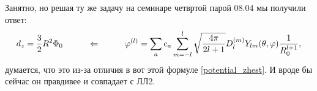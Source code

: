 Занятно, но решая ту же задачу на семинаре четвртой парой 08.04 мы получили ответ:
\begin{equation*}
 	d_z = \frac{3}{2}R^2 \Phi_0 	
 	\hspace{1 cm}
 	\Leftarrow
 	\hspace{1 cm}
 	\varphi^{(l)} = \sum_a e_a\sum_{m = -l}^l \sqrt{\frac{4 \pi}{2 l +1}} D_l^{(m)} Y_{l m} (\theta, \varphi) \frac{1}{R_0^{l+1}},
\end{equation*}
думается, что это из-за отличия в вот этой формуле \eqref{potential_zhest}. И вроде бы сейчас он правдивее и совпадает с ЛЛ2.